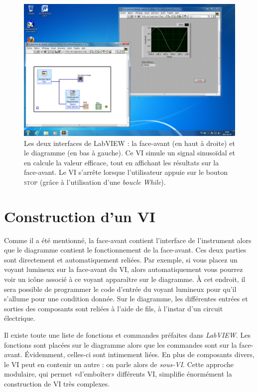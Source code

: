 \documentclass[12pt,oneside,letterpaper]{article}
\begin{document}
\begin{figure}[h]
\includegraphics[width=\textwidth]{A classer/LabVIEW-1.png}
\caption{\label{Pauling}Les deux interfaces de LabVIEW : la face-avant (en haut à droite) et le diagramme (en bas à gauche). Ce VI simule un signal sinusoïdal et en calcule la valeur efficace, tout en affichant les résultats sur la face-avant. Le VI s'arrête lorsque l'utilisateur appuie sur le bouton \textsc{stop} (grâce à l'utilisation d'une \textit{boucle While}).}
\end{figure}


\section{Construction d'un VI}

Comme il a été mentionné, la face-avant contient l'interface de l'instrument alors que le diagramme contient le fonctionnement de la face-avant. Ces deux parties sont directement et automatiquement reliées. Par exemple, si vous placez un voyant lumineux sur la face-avant du VI, alors automatiquement vous pourrez voir un icône associé à ce voyant apparaître sur le diagramme. À cet endroit, il sera possible de programmer le code d'entrée du voyant lumineux pour qu'il s'allume pour une condition donnée. Sur le diagramme, les différentes entrées et sorties des composants sont reliées à l'aide de fils, à l'instar d'un circuit électrique.

Il existe toute une liste de fonctions et commandes préfaites dans \textit{LabVIEW}. Les fonctions sont placées sur le diagramme alors que les commandes sont sur la face-avant. Évidemment, celles-ci sont intimement liées. En plus de composants divers, le VI peut en contenir un autre : on parle alors de \textit{sous-VI}. Cette approche modulaire, qui permet «d'emboîter» différents VI, simplifie énormément la construction de VI très complexes.
\end{document}
